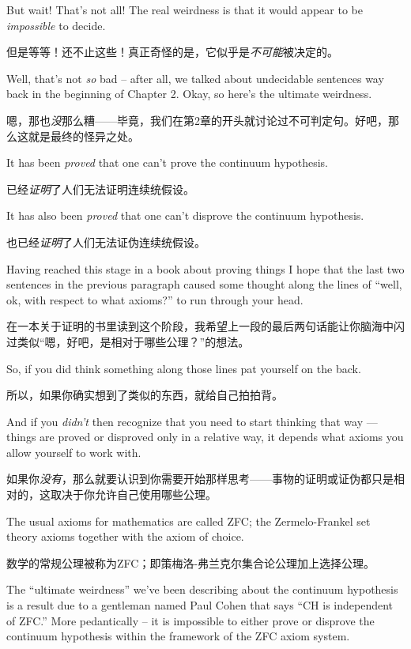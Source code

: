 But wait!  That's not all!  The real weirdness is that it
would appear to be \emph{impossible} to decide.

但是等等！还不止这些！真正奇怪的是，它似乎是\emph{不可能}被决定的。

Well, that's not \emph{so} bad -- after all, we talked about undecidable sentences way back in the beginning
of Chapter 2.   Okay, so here's the ultimate weirdness.

嗯，那也\emph{没}那么糟——毕竟，我们在第2章的开头就讨论过不可判定句。好吧，那么这就是最终的怪异之处。

It has been \emph{proved} that one can't prove the continuum hypothesis.

已经\emph{证明}了人们无法证明连续统假设。

It has also been \emph{proved} that one can't disprove the continuum hypothesis.

也已经\emph{证明}了人们无法证伪连续统假设。

Having reached this stage in a book about proving things I hope that the
last two sentences in the previous paragraph caused some thought along the
lines of ``well, ok, with respect to what axioms?'' to run through your
head.

在一本关于证明的书里读到这个阶段，我希望上一段的最后两句话能让你脑海中闪过类似“嗯，好吧，是相对于哪些公理？”的想法。

So, if you did think something along those lines pat yourself on the
back.

所以，如果你确实想到了类似的东西，就给自己拍拍背。

And if you \emph{didn't} then recognize that you need to start thinking
that way --- things are proved or disproved only in a relative way, it depends
what axioms you allow yourself to work with.

如果你\emph{没有}，那么就要认识到你需要开始那样思考——事物的证明或证伪都只是相对的，这取决于你允许自己使用哪些公理。

The usual axioms for mathematics
are called ZFC; the Zermelo-Frankel set theory axioms together with the
axiom of choice.

数学的常规公理被称为ZFC；即策梅洛-弗兰克尔集合论公理加上选择公理。

The ``ultimate weirdness'' we've been describing about
the continuum hypothesis is a result due to a gentleman named  Paul Cohen that says ``CH is independent of ZFC.''   More pedantically --
it is impossible to either prove or disprove the continuum hypothesis within
the framework of the ZFC axiom system.

